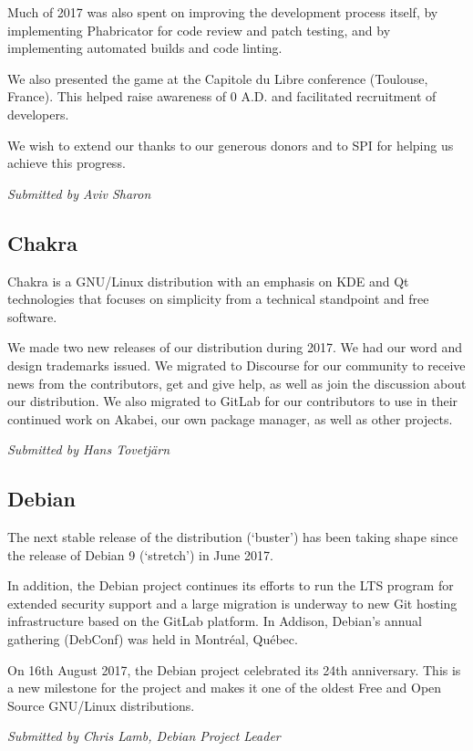 \documentclass[a4paper]{report}
\begin{document}
Much of 2017 was also spent on improving the development process itself,
by implementing Phabricator for code review and patch testing, and by
implementing automated builds and code linting.

We also presented the game at the Capitole du Libre conference
(Toulouse, France). This helped raise awareness of 0 A.D. and
facilitated recruitment of developers.

We wish to extend our thanks to our generous donors and to SPI for
helping us achieve this progress.

{\em Submitted by Aviv Sharon}

\subsection{Chakra}

Chakra is a GNU/Linux distribution with an emphasis on KDE and Qt
technologies that focuses on simplicity from a technical standpoint and
free software.

We made two new releases of our distribution during 2017. We had our
word and design trademarks issued. We migrated to Discourse for our
community to receive news from the contributors, get and give help, as
well as join the discussion about our distribution. We also migrated to
GitLab for our contributors to use in their continued work on Akabei,
our own package manager, as well as other projects.

{\em Submitted by Hans Tovetjärn}

\subsection{Debian}

The next stable release of the distribution (`buster') has been taking
shape since the release of Debian 9 (`stretch') in June 2017.

In addition, the Debian project continues its efforts to run the LTS
program for extended security support and a large migration is underway
to new Git hosting infrastructure based on the GitLab platform. In
Addison, Debian's annual gathering (DebConf) was held in Montréal,
Québec.

On 16th August 2017, the Debian project celebrated its 24th anniversary.
This is a new milestone for the project and makes it one of the oldest
Free and Open Source GNU/Linux distributions.

{\em Submitted by Chris Lamb, Debian Project Leader}
\end{document}
